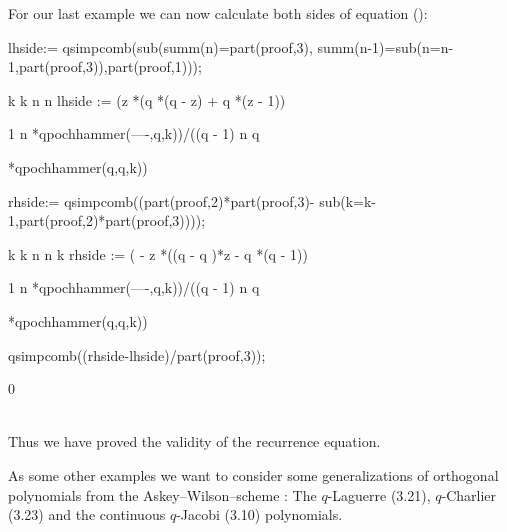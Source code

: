 For our last example we can now calculate both sides of
equation ():

\begin{redoutput}
\redprompt lhside:= qsimpcomb(sub(summ(n)=part(proof,3),
    summ(n-1)=sub(n=n-1,part(proof,3)),part(proof,1)));

            k   k   n         n
lhside := (z *(q *(q  - z) + q *(z - 1))

                         1            n
           *qpochhammer(----,q,k))/((q  - 1)
                          n
                         q

             *qpochhammer(q,q,k))

\redprompt rhside:= qsimpcomb((part(proof,2)*part(proof,3)-
    sub(k=k-1,part(proof,2)*part(proof,3))));

               k    k    n       n   k
rhside := ( - z *((q  - q )*z - q *(q  - 1))

                         1            n
           *qpochhammer(----,q,k))/((q  - 1)
                          n
                         q

             *qpochhammer(q,q,k))

\redprompt qsimpcomb((rhside-lhside)/part(proof,3));

0
\end{redoutput}
%
\\[-2.5ex]\noindent{}
Thus we have proved the validity of the recurrence equation.

As some other examples we want to consider some generalizations
of orthogonal polynomials from the
Askey--Wilson--scheme \cite{KoekoekSwarttouw:94}: The $q$-Laguerre
(3.21), $q$-Charlier (3.23) and the continuous $q$-Jacobi (3.10)
polynomials.



